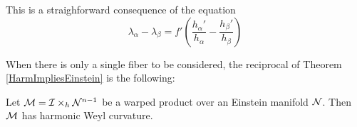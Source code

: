         \begin{demm}
            This is a straighforward consequence of the equation
            \[
        \lambda_{\alpha} - \lambda_{\beta} = f' \left(\frac{h_{\alpha}'}{h_{\alpha}}  - \frac{h_{\beta}'}{h_{\beta}} \right)
        \] 
        \end{demm}
        
        When there is only a single fiber to be considered, the reciprocal of Theorem \cref{HarmImpliesEinstein} is the following:
        
        \begin{teorema}\label{harmWarp}
            Let $\mathcal{M} = \mathcal{I} \times_{h} \mathcal{N}^{n-1}$ be a warped product over an Einstein manifold $\mathcal{N}$. Then $\mathcal{M}$ has harmonic Weyl curvature.
        \end{teorema}
        
